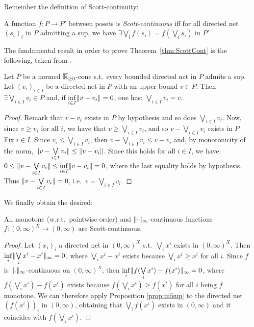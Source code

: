 Remember the definition of Scott-continuity:

\begin{definition}
 A function $f:P\to P'$ between posets is \emph{Scott-continuous} iff for all directed net $(s_i)_i$ in $P$ admitting a sup, we have $\exists \bigvee\limits_i f(s_i) = f(\bigvee\limits_i s_i)$ in $P'$. 
\end{definition}

The fundamental result in order to prove Theorem~\ref{thm:ScottCont} is the following, taken from \cite{Selinger2004}.

\begin{proposition}\label{prop:infsup}
 Let $P$ be a normed $\overline{\mathbb{R}}_{\geq 0}$-cone s.t.\ every bounded directed net in $P$ admits a sup.
 Let $(v_i)_{i\in I}$ be a directed net in $P$ with an upper bound $v\in P$.
 Then $\exists\bigvee\limits_{i\in I} v_i \in P$ and, if $\inf\limits_{i\in I} \lVert v-v_i\rVert =0$, one has: $\bigvee\limits_{i\in I} v_i = v$.
\end{proposition}
\begin{proof}
 Remark that $v-v_i$ exists in $P$ by hypothesis and so does $\bigvee\limits_{i\in I} v_i$. %
 Now, since $v\geq v_i$ for all $i$, we have that $v\geq \bigvee\limits_{i\in I} v_i$, and so $v-\bigvee\limits_{i\in I} v_i$ exists in $P$.
 Fix $i\in I$.
 Since $v_i\leq \bigvee\limits_{i\in I} v_i$, then $v-\bigvee\limits_{i\in I} v_i\leq v-v_i$ and, by monotonicity of the norm, $\lVert v-\bigvee\limits_{i\in I} v_i\rVert\leq \lVert v-v_i\rVert$.
 Since this holds for all $i\in I$, we have:
 $0\leq \lVert v-\bigvee\limits_{i\in I} v_i\rVert\leq \inf\limits_{i\in I} \lVert v-v_i\rVert=0$, where the last equality holds by hypothesis.
 Thus $\lVert v-\bigvee\limits_{i\in I} v_i\rVert=0$, i.e.\ $v=\bigvee\limits_{i\in I} v_i$.
\end{proof}

We finally obtain the desired:

\begin{theorem}
  All monotone (w.r.t.\ pointwise order) and $\lVert\cdot\rVert_{\infty}$-continuous functions $f:(0,\infty)^X\to (0,\infty)$ are Scott-continuous.
\end{theorem}
\begin{proof}
 Let $(x_i)_i$ a directed net in $(0,\infty)^X$ s.t.\ $\bigvee\limits_i x^i$ exists in $(0,\infty)^X$.
 Then $\inf\limits_i \lVert\bigvee\limits_i x^i - x^i\rVert_\infty =0$, where $\bigvee\limits_i x^i - x^i$ exists because $\bigvee\limits_i x^i \geq x^i$ for all $i$.
 Since $f$ is $\lVert.\rVert_\infty$-continuous on $(0,\infty)^X$, then $\inf\limits_i \lVert f(\bigvee\limits_i x^i) - f(x^i)\rVert_\infty =0$, where $f(\bigvee\limits_i x^i) - f(x^i)$ exists because $f(\bigvee\limits_i x^i) \geq f(x^i)$ for all $i$ being $f$ monotone.
 We can therefore apply Proposition \ref{prop:infsup} to the directed net $(f(x^i))_i$ in $(0,\infty)$, obtaining that $\bigvee\limits_i f(x^i)$ exists in $(0,\infty)$ and it coincides with $f(\bigvee\limits_i x^i)$.
\end{proof}

